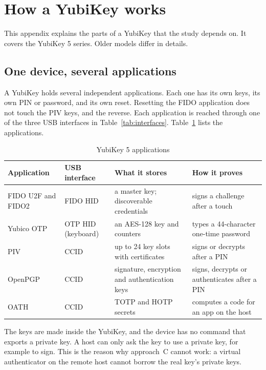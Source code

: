\section{How a YubiKey works}
\label{app:yubikey}

This appendix explains the parts of a YubiKey that the study depends on.
It covers the YubiKey 5 series. Older models differ in details.

\subsection{One device, several applications}

A YubiKey holds several independent applications. Each one has its own keys,
its own PIN or password, and its own reset. Resetting the FIDO application
does not touch the PIV keys, and the reverse. Each application is reached
through one of the three USB interfaces in Table~\ref{tab:interfaces}.
Table~\ref{tab:apps} lists the applications.

\begin{table}[t]
\centering
\caption{YubiKey 5 applications}
\label{tab:apps}
\scriptsize
\begin{tabular}{@{}>{\raggedright\arraybackslash}p{13mm}>{\raggedright\arraybackslash}p{9mm}>{\raggedright\arraybackslash}p{24mm}>{\raggedright\arraybackslash}p{24mm}@{}}
\toprule
Application & USB interface & What it stores & How it proves \\
\midrule
FIDO U2F and FIDO2 & FIDO HID & a master key; discoverable credentials & signs a challenge after a touch \\
Yubico OTP & OTP HID (keyboard) & an AES-128 key and counters & types a 44-character one-time password \\
PIV & CCID & up to 24 key slots with certificates & signs or decrypts after a PIN \\
OpenPGP & CCID & signature, encryption and authentication keys & signs, decrypts or authenticates after a PIN \\
OATH & CCID & TOTP and HOTP secrets & computes a code for an app on the host \\
\bottomrule
\end{tabular}
\end{table}

The keys are made inside the YubiKey, and the device has no command that
exports a private key. A host can only ask the key to use a private key, for
example to sign. This is the reason why approach~C cannot work: a virtual
authenticator on the remote host cannot borrow the real key's private keys.

